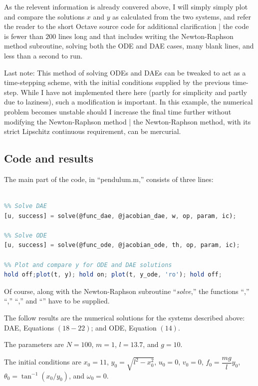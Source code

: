 \documentclass[11pt]{amsdtx}
\begin{document}
As the relevent information is already convered above, I will simply simply plot and compare the solutions $x$ and $y$ as calculated from the two systems, and refer the reader to the short Octave source code for additional clarification | the code is fewer than $200$ lines long and that includes writing the Newton-Raphson method subroutine, solving both the ODE and DAE cases, many blank lines, and less than a second to run.

Last note:  This method of solving ODEs and DAEs can be tweaked to act as a time-stepping scheme, with the initial conditions supplied by the previous time-step.  While I have not implemented there here (partly for simplicity and partly due to laziness), such a modification is important.  In this example, the numerical problem becomes unstable should I increase the final time further without modifying the Newton-Raphson method | the Newton-Raphson method, with its strict Lipschitz continuous requirement, can be mercurial.


\subsection{Code and results}


The main part of the code, in ``pendulum.m,'' consists of three lines:
\footnotesize{
\begin{lstlisting}[language=Octave, frame=single] 

%% Solve DAE
[u, success] = solve(@func_dae, @jacobian_dae, w, op, param, ic);

%% Solve ODE
[u, success] = solve(@func_ode, @jacobian_ode, th, op, param, ic);

%% Plot and compare y for ODE and DAE solutions
hold off;plot(t, y); hold on; plot(t, y_ode, 'ro'); hold off;

\end{lstlisting}
}
\normalsize{}
Of course, along with the Newton-Raphson subroutine ``\textit{solve},'' the functions ``\textit{},'' ``\textit{},'' ``\textit{},'' and ``\textit{}'' have to be supplied.


The follow results are the numerical solutions for the systems described above: DAE, Equations $(18 - 22)$; and ODE, Equation $(14)$.  

The parameters are $N = 100$, $m = 1$, $l = 13.7$, and $g = 10$.

The initial conditions are $x_0 = 11$, $y_0 = \sqrt{l^2 - x_0^2}$, $u_0 = 0$, $v_0 = 0$, $f_0 = \dfrac{mg}{l}y_0$, $\theta_0 = \tan^{-1}\left( x_0 / y_0\right)$, and $\omega_0 = 0$.
\end{document}
